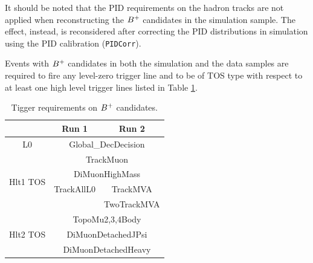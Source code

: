 %
It should be noted that the PID requirements on the hadron tracks are not applied when reconstructing the ${{{B}^+}}$ candidates in the simulation sample.
The effect, instead, is reconsidered after correcting the PID distributions in simulation using the PID calibration (\texttt{PIDCorr}). 

Events with ${{{B}^+}}$ candidates in both the simulation and the data samples are required to fire any level-zero trigger line and to be of TOS type with respect to at least one high level trigger lines listed in Table \ref{trigger}.

\begin{table}[h]
\centering
\caption{Tigger requirements on ${{{B}^+}}$ candidates.}
\begin{tabular}{c|c|c}
\hline
     & Run 1 & Run 2 \\
\hline
L0 &  \multicolumn{2}{c}{Global\_DecDecision}  \\
\hline
\multirow{4}{*}{Hlt1 TOS} & \multicolumn{2}{c}{TrackMuon} \\
& \multicolumn{2}{c}{DiMuonHighMass }                            \\
& TrackAllL0 & TrackMVA \\
& &  TwoTrackMVA \\
                       \hline
\multirow{3}{*}{Hlt2 TOS} &\multicolumn{2}{c}{TopoMu2,3,4Body}\\
&\multicolumn{2}{c}{DiMuonDetachedJPsi}\\
&\multicolumn{2}{c}{DiMuonDetachedHeavy}\\
\hline
\end{tabular}
\normalsize
\label{trigger}
\end{table}



